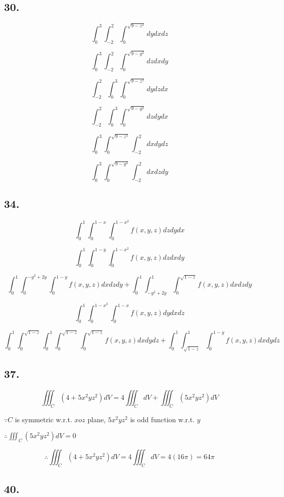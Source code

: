 \documentclass{article}
\begin{document}
  \subsection*{30. }



  $$\int_0^3 \int_{-2}^2 \int_0^{\sqrt{9-z^2}} dy dx dz$$

  $$\int_0^3 \int_{-2}^2 \int_0^{\sqrt{9-y^2}} dz dx dy$$

  $$\int_{-2}^2 \int_0^3 \int_0^{\sqrt{9-z^2}} dy dz dx$$

  $$\int_{-2}^2 \int_0^3 \int_0^{\sqrt{9-y^2}} dz dy dx$$

  $$\int_0^3 \int_0^{\sqrt{9-z^2}} \int_{-2}^2 dx dy dz$$

  $$\int_0^3 \int_0^{\sqrt{9-y^2}} \int_{-2}^2 dx dz dy$$

  \subsection*{34. }

  $$\int_0^1 \int_0^{1-x} \int_0^{1-x^2} f(x, y, z) dz dy dx$$

  $$\int_0^1 \int_0^{1-y} \int_0^{1-x^2} f(x, y, z) dz dx dy$$

  $$\int_0^1  \int_0^{-y^2+2y} \int_0^{1-y} f(x, y, z) dx dz dy + \int_0^1 \int_{-y^2+2y}^1 \int_0^{\sqrt{1-z}} f(x, y, z) dx dz dy$$

  $$\int_0^1 \int_0^{1-x^2} \int_0^{1-x} f(x, y, z) dy dx dz$$

  $$\int_0^1 \int_0^{\sqrt{1-z}} \int_0^1 \int_0^{\sqrt{1-z}} \int_0^{\sqrt{1-z}} f(x, y, z) dx dy dz + \int_0^1 \int_{\sqrt{1-z}}^1 \int_0^{1-y} f(x, y, z) dx dy dz$$

  \subsection*{37. }

  $$\iiint_C (4+5x^2yz^2) dV = 4\iiint_C dV + \iiint_C (5x^2yz^2) dV$$

  $\because C$ is symmetric w.r.t. $xoz$ plane, $5x^2yz^2$ is odd function w.r.t. $y$

  $\therefore \iiint_C (5x^2yz^2)dV = 0$

  $$\therefore \iiint_C (4+5x^2yz^2) dV = 4\iiint_C dV = 4 (16\pi) = 64\pi$$

  \subsection*{40. }
\end{document}
